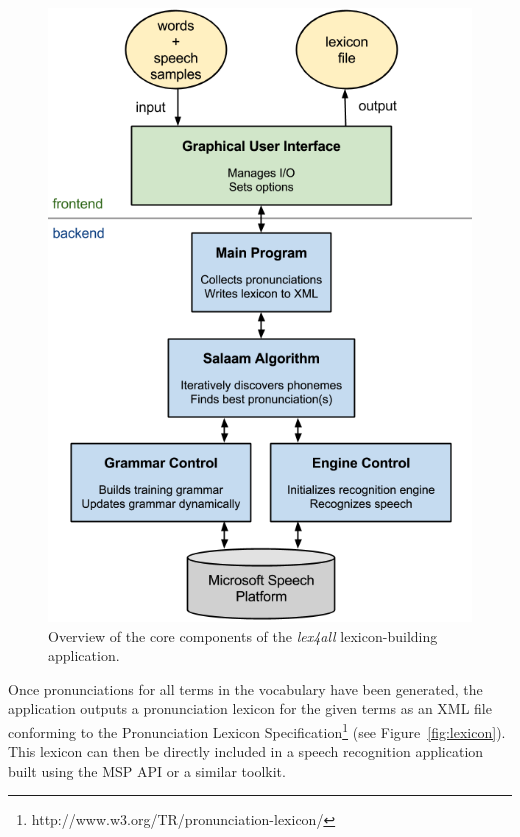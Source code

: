 \documentclass[11pt]{article}
\begin{document}
\begin{figure}[t]
\begin{center}
\includegraphics[width=\columnwidth]{../img/SystemOverview-compact.png}
\caption{Overview of the core components of the \textit{lex4all} lexicon-building application.\label{fig:system}}
\end{center}
\end{figure}

Once pronunciations for all terms in the vocabulary have been generated, the application outputs a pronunciation lexicon for the given terms as an XML file conforming to the Pronunciation Lexicon Specification\footnote{http://www.w3.org/TR/pronunciation-lexicon/} (see Figure~\ref{fig:lexicon}). This lexicon can then be directly included in a speech recognition application built using the MSP API or a similar toolkit.
\end{document}
